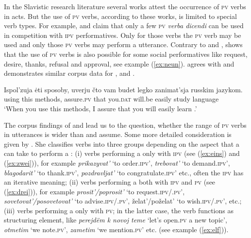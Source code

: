 \documentclass[output=paper,colorlinks,citecolor=brown,newtxmath,hidelinks]{langscibook}
\begin{document}
In the Slavistic research literature several works attest the occurrence of \textsc{pv}  verbs in  acts. But the use of \textsc{pv} verbs, according to these works, is limited to special verb types. For example, \citet{Rjabceva1992} and \citet{Dickey2000} claim that only a few \textsc{pv} \textit{verba dicendi} can be used in competition with \textsc{ipv} performatives. Only for those verbs the \textsc{pv} verb may be used and only those \textsc{pv} verbs may perform a  utterance. Contrary to \citeauthor{Rjabceva1992} and \citeauthor{Dickey2000}, \citeauthor{Wiemer2014} shows that the use of \textsc{pv}  verbs is also possible for some social performatives like request, desire, thanks, refusal and approval, see example (\ref{ex:neun}). \citet{Laczinski2014} agrees with \citeauthor{Wiemer2014} and demonstrates similar corpus data for ,  and .

\ea\label{ex:neun}
\gll Ispol’zuja ėti sposoby, uverju čto vam budet legko zanimat’sja russkim jazykom.\\
             using               this         methods,	assure\textsc{.pv}	   that	         you.\textsc{dat}	  will.be        easily          study                          language\\
\glt ‘When you use this methods, I assure that you will easily learn .’\\
\hfill \citep[107]{Wiemer2014}
\z

\newpage 
\noindent The corpus findings of \citeauthor{Wiemer2014} and \citeauthor{Laczinski2014} lead us to the question, whether the range of \textsc{pv} verbs in  utterances is wider than \citeauthor{Rjabceva1992} and \citeauthor{Dickey2000} assume. Some more detailed consideration is given by \citet{Israeli1996,Israeli2001}. She classifies  verbs into three groups depending on the  aspect that a  can take to perform a  \citep[84]{Israeli2001}: (i) verbs performing a  only with \textsc{ipv} (see (\ref{ex:eins}) and (\ref{ex:zwei})), for example \textit{prikazyvat’} ‘to order\textsc{.ipv}’, \textit{trebovat’} ‘to demand\textsc{.ipv}’, \textit{blagodarit’} ‘to thank\textsc{.ipv}’, \textit{pozdravljat’} ‘to congratulate\textsc{.ipv}’ etc., often the \textsc{ipv}  has an iterative meaning; (ii) verbs performing a  both with \textsc{ipv} and \textsc{pv} (see (\ref{ex:drei})), for example \textit {prosit’/poprosit’} ‘to request\textsc{.ipv}/\textsc{.pv}’, \textit{sovetovat’/posovetovat’} ‘to advise\textsc{.ipv}/\textsc{.pv}’, želat’/poželat’ ‘to wish\textsc{.ipv}/\textsc{.pv}’, etc.; (iii) verbs performing a  only with \textsc{pv}; in the latter case, the verb functions as structuring element, like \textit{perejdëm k novoj teme} ‘let’s open\textsc{.pv} a new  topic’, \textit{otmetim} ‘we note\textsc{.pv}’, \textit{zametim} ‘we mention\textsc{.pv}’ etc. (see example (\ref{ex:elf})). 
\end{document}
